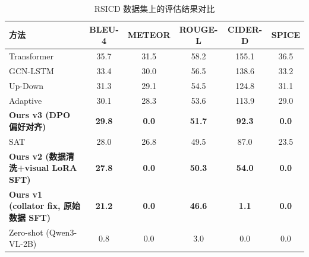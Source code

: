 
\begin{table}[htbp]
  \centering
  \caption{RSICD 数据集上的评估结果对比}
  \label{tab:benchmark_rsicd}
  \begin{tabular}{lccccc}
    \toprule
    方法 & BLEU-4 & METEOR & ROUGE-L & CIDER-D & SPICE \\
    \midrule
    Transformer &     35.7 &     31.5 &     58.2 &     155.1 &     36.5 \\
    GCN-LSTM &     33.4 &     30.0 &     56.5 &     138.6 &     33.2 \\
    Up-Down &     31.3 &     29.1 &     54.5 &     124.8 &     31.1 \\
    Adaptive &     30.1 &     28.3 &     53.6 &     113.9 &     29.0 \\
    \textbf{Ours v3 (DPO 偏好对齐)} &     \textbf{29.8} &     \textbf{0.0} &     \textbf{51.7} &     \textbf{92.3} &     \textbf{0.0} \\
    SAT &     28.0 &     26.8 &     49.5 &     87.0 &     23.5 \\
    \textbf{Ours v2 (数据清洗+visual LoRA SFT)} &     \textbf{27.8} &     \textbf{0.0} &     \textbf{50.3} &     \textbf{54.0} &     \textbf{0.0} \\
    \textbf{Ours v1 (collator fix, 原始数据 SFT)} &     \textbf{21.2} &     \textbf{0.0} &     \textbf{46.6} &     \textbf{1.1} &     \textbf{0.0} \\
    Zero-shot (Qwen3-VL-2B) &     0.8 &     0.0 &     3.0 &     0.0 &     0.0 \\
    \bottomrule
  \end{tabular}
\end{table}

